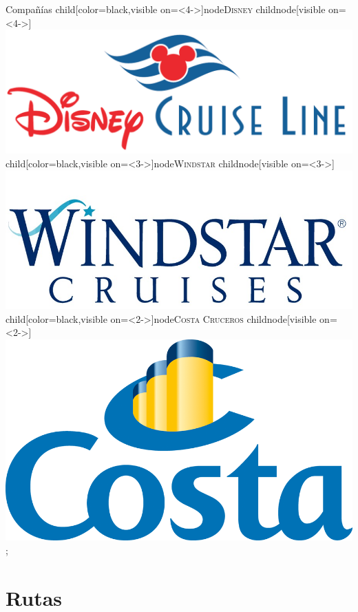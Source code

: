 \documentclass{beamer}
\begin{document}
\begin{frame}{Compañías}
{}
child[color=black,visible on=<4->]{node{\scshape Disney}
	child{node[visible on=<4->]{\includegraphics[scale=0.08]{DY}}}
}
child[color=black,visible on=<3->]{node{\scshape Windstar}
	child{node[visible on=<3->]{\includegraphics[scale=0.07]{WC}}}
}
child[color=black,visible on=<2->]{node{\scshape Costa Cruceros}
	child{node[visible on=<2->]{\includegraphics[scale=0.05]{CC}}}
};


\end{frame}


\section{Rutas}%
\end{document}
